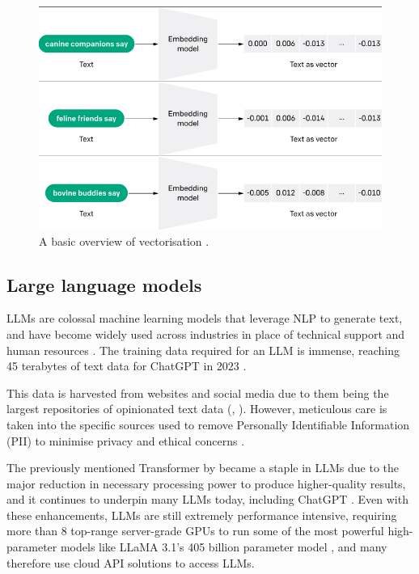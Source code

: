 \documentclass[12pt]{report}
\begin{document}
    \begin{figure}[H]
        \centering
        \includegraphics[width=.6\linewidth]{basicVectorisation.png}
        \caption{A basic overview of vectorisation \autocite{openai_introducing_nodate}.}
        \label{fig:basicVectorisation}
    \end{figure}
    

    \pagebreak 

    \subsection{Large language models}
    LLMs are colossal machine learning models that leverage NLP to generate text, and have become widely used across 
    industries in place of technical support and human resources \autocite{vrontis_artificial_2022}. The training data required for an LLM is immense, 
    reaching 45 terabytes of text data for ChatGPT in 2023 \autocite{dwivedi_so_2023}. 
    
    This data is harvested from websites and social media due to them being the largest repositories of 
    opinionated text data (\textcite{dubey_llama_2024}, \textcite{wang_fine-grained_2016}). 
    However, meticulous care is taken into the specific sources used to remove 
    Personally Identifiable Information (PII) to minimise privacy and ethical concerns \autocite{dubey_llama_2024}.
    
    The previously mentioned Transformer by \textcite{vaswani_attention_2017} 
    became a staple in LLMs due to the major reduction in necessary processing power to produce higher-quality 
    results, and it continues to underpin many LLMs today, including ChatGPT \autocite{brown_language_2020}. 
    Even with these enhancements, LLMs are still extremely performance intensive,
    requiring more than 8 top-range server-grade GPUs to run some of the most powerful high-parameter models like LLaMA 3.1's 405 billion parameter model \autocite{dubey_llama_2024},
    and many therefore use cloud API solutions to access LLMs.
    
\end{document}
